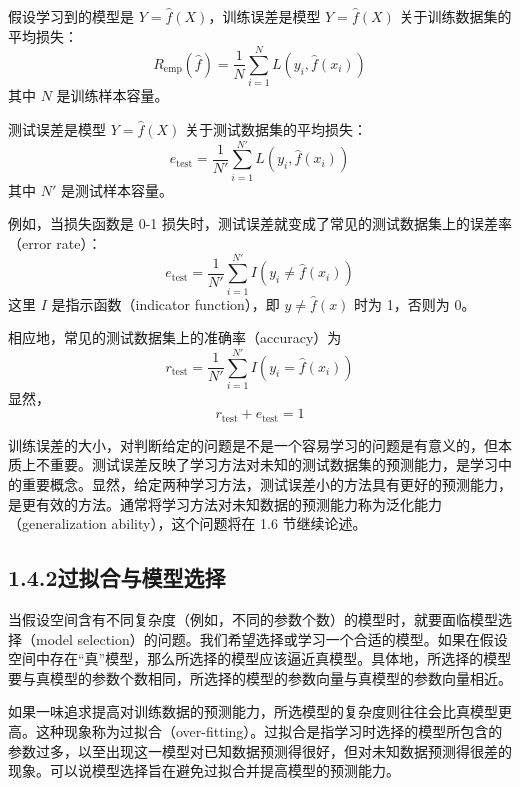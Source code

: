 \documentclass[UTF8,12pt,a4paper,fontset=fandol]{ctexart}
\begin{document}
假设学习到的模型是 $Y=\hat f(X)$，训练误差是模型 $Y=\hat f(X)$ 关于训练数据集的平均损失：
\begin{equation}
  R_{\mathrm{emp}}(\hat f)=\frac1N\sum_{i=1}^N L(y_i,\hat f(x_i))
  \tag{1.18}
\end{equation}
其中 $N$ 是训练样本容量。

测试误差是模型 $Y=\hat f(X)$ 关于测试数据集的平均损失：
\begin{equation}
  e_{\mathrm{test}}=\frac1{N'}\sum_{i=1}^{N'} L(y_i,\hat f(x_i))
  \tag{1.19}
\end{equation}
其中 $N'$ 是测试样本容量。

例如，当损失函数是 0-1 损失时，测试误差就变成了常见的测试数据集上的误差率（error rate）：
\begin{equation}
  e_{\mathrm{test}}=\frac1{N'}\sum_{i=1}^{N'} I(y_i\ne\hat f(x_i))
  \tag{1.20}
\end{equation}
这里 $I$ 是指示函数（indicator function），即 $y\ne\hat f(x)$ 时为 1，否则为 0。

相应地，常见的测试数据集上的准确率（accuracy）为
\begin{equation}
  r_{\mathrm{test}}=\frac1{N'}\sum_{i=1}^{N'} I(y_i=\hat f(x_i))
  \tag{1.21}
\end{equation}
显然，
\[
  r_{\mathrm{test}}+e_{\mathrm{test}}=1
\]

训练误差的大小，对判断给定的问题是不是一个容易学习的问题是有意义的，但本质上不重要。测试误差反映了学习方法对未知的测试数据集的预测能力，是学习中的重要概念。显然，给定两种学习方法，测试误差小的方法具有更好的预测能力，是更有效的方法。通常将学习方法对未知数据的预测能力称为泛化能力（generalization ability），这个问题将在 1.6 节继续论述。

\subsection*{1.4.2\quad 过拟合与模型选择}

当假设空间含有不同复杂度（例如，不同的参数个数）的模型时，就要面临模型选择（model selection）的问题。我们希望选择或学习一个合适的模型。如果在假设空间中存在“真”模型，那么所选择的模型应该逼近真模型。具体地，所选择的模型要与真模型的参数个数相同，所选择的模型的参数向量与真模型的参数向量相近。

如果一味追求提高对训练数据的预测能力，所选模型的复杂度则往往会比真模型更高。这种现象称为过拟合（over-fitting）。过拟合是指学习时选择的模型所包含的参数过多，以至出现这一模型对已知数据预测得很好，但对未知数据预测得很差的现象。可以说模型选择旨在避免过拟合并提高模型的预测能力。
\end{document}
